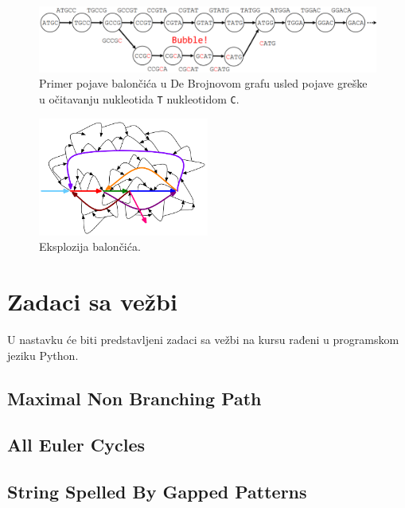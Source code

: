 \begin{figure}[H]
	\centering
	\includegraphics[width=\textwidth]{poglavlja/3/slike/baloncic.png}
	\caption{Primer pojave balon\v ci\'ca u De Brojnovom grafu usled pojave gre\v ske u o\v citavanju nukleotida \texttt{T} nukleotidom \texttt{C}.}
	\label{slika:baloncic}
\end{figure} 

\begin{figure}[H]
	\centering
	\includegraphics[width=0.5\textwidth]{poglavlja/3/slike/eksplozija-baloncica.png}
	\caption{Eksplozija balon\v ci\'ca.}
	\label{slika:eksplozija baloncica}
\end{figure}

\section{Zadaci sa vežbi}
\setexamplecodestyle

U nastavku će biti predstavljeni zadaci sa vežbi na kursu rađeni u programskom jeziku Python.

\subsection{Maximal Non Branching Path}



\subsection{All Euler Cycles}



\subsection{String Spelled By Gapped Patterns}



\blankpage